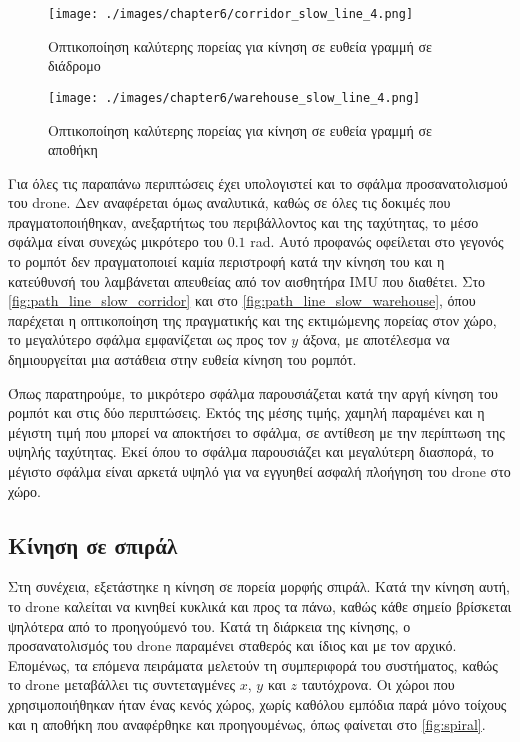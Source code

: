 \begin{figure}[!ht]
    \centering
    \texttt{[image: ./images/chapter6/corridor\_slow\_line\_4.png]}
    \caption{Οπτικοποίηση καλύτερης πορείας για κίνηση σε ευθεία γραμμή σε διάδρομο}
    \label{fig:path_line_slow_corridor}
\end{figure}

\begin{figure}[!ht]
    \centering
    \texttt{[image: ./images/chapter6/warehouse\_slow\_line\_4.png]}
    \caption{Οπτικοποίηση καλύτερης πορείας για κίνηση σε ευθεία γραμμή σε αποθήκη}
    \label{fig:path_line_slow_warehouse}
\end{figure}

Για όλες τις παραπάνω περιπτώσεις έχει υπολογιστεί και το σφάλμα προσανατολισμού του drone. Δεν αναφέρεται όμως αναλυτικά, καθώς σε όλες τις δοκιμές που πραγματοποιήθηκαν, ανεξαρτήτως του περιβάλλοντος και της ταχύτητας, το μέσο σφάλμα είναι συνεχώς μικρότερο του $0.1$ rad. Αυτό προφανώς οφείλεται στο γεγονός το ρομπότ δεν πραγματοποιεί καμία περιστροφή κατά την κίνηση του και η κατεύθυνσή του λαμβάνεται απευθείας από τον αισθητήρα IMU που διαθέτει. Στο \autoref{fig:path_line_slow_corridor} και στο \autoref{fig:path_line_slow_warehouse}, όπου παρέχεται η οπτικοποίηση της πραγματικής και της εκτιμώμενης πορείας στον χώρο, το μεγαλύτερο σφάλμα εμφανίζεται ως προς τον $y$ άξονα, με αποτέλεσμα να δημιουργείται μια αστάθεια στην ευθεία κίνηση του ρομπότ.

Όπως παρατηρούμε, το μικρότερο σφάλμα παρουσιάζεται κατά την αργή κίνηση του ρομπότ και στις δύο περιπτώσεις. Εκτός της μέσης τιμής, χαμηλή παραμένει και η μέγιστη τιμή που μπορεί να αποκτήσει το σφάλμα, σε αντίθεση με την περίπτωση της υψηλής ταχύτητας. Εκεί όπου το σφάλμα παρουσιάζει και μεγαλύτερη διασπορά, το μέγιστο σφάλμα είναι αρκετά υψηλό για να εγγυηθεί ασφαλή πλοήγηση του drone στο χώρο.

\clearpage

\subsection{Κίνηση σε σπιράλ}
\label{subsection:localization_tests_spiral}

Στη συνέχεια, εξετάστηκε η κίνηση σε πορεία μορφής σπιράλ. Κατά την κίνηση αυτή, το drone καλείται να κινηθεί κυκλικά και προς τα πάνω, καθώς κάθε σημείο βρίσκεται ψηλότερα από το προηγούμενό του. Κατά τη διάρκεια της κίνησης, ο προσανατολισμός του drone παραμένει σταθερός και ίδιος και με τον αρχικό. Επομένως, τα επόμενα πειράματα μελετούν τη συμπεριφορά του συστήματος, καθώς το drone μεταβάλλει τις συντεταγμένες $x$, $y$ και $z$ ταυτόχρονα. Οι χώροι που χρησιμοποιήθηκαν ήταν ένας κενός χώρος, χωρίς καθόλου εμπόδια παρά μόνο τοίχους και η αποθήκη που αναφέρθηκε και προηγουμένως, όπως φαίνεται στο \autoref{fig:spiral}.

